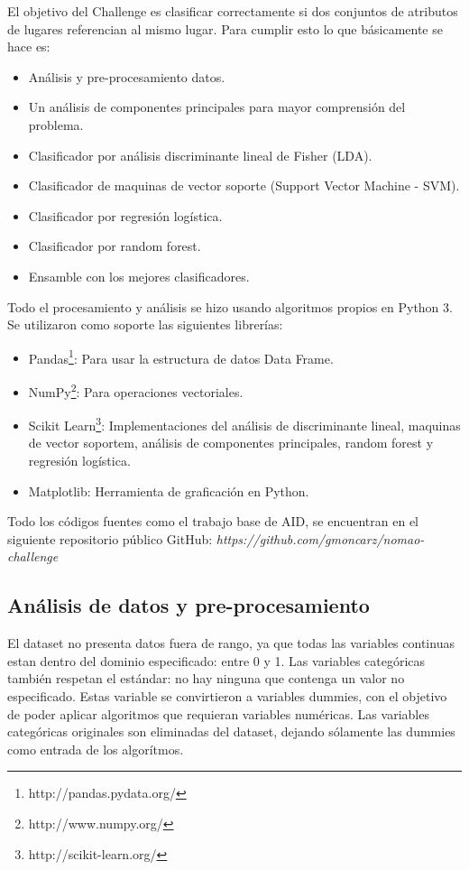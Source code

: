 \documentclass[journal]{IEEEtran}
\begin{document}
El objetivo del Challenge es clasificar correctamente si dos conjuntos 
de atributos de lugares referencian al mismo lugar. Para cumplir esto lo que básicamente se hace es:
\begin{itemize}
\item Análisis y pre-procesamiento datos. 
\item Un análisis de componentes principales para mayor comprensión del problema. 
\item Clasificador por análisis discriminante lineal de Fisher (LDA).
\item Clasificador de maquinas de vector soporte (Support Vector Machine - SVM).
\item Clasificador por regresión logística.
\item Clasificador por random forest.
\item Ensamble con los mejores clasificadores.
\end{itemize}

Todo el procesamiento y análisis se hizo usando algoritmos propios en Python 3. Se
utilizaron como soporte las siguientes librerías:
\begin{itemize}
\item Pandas\footnote{http://pandas.pydata.org/}: Para usar la estructura de datos Data Frame.
\item NumPy\footnote{http://www.numpy.org/}: Para operaciones vectoriales.
\item Scikit Learn\footnote{http://scikit-learn.org/}: Implementaciones del análisis 
	de discriminante lineal, maquinas de vector soportem, análisis
	de componentes principales, random forest y regresión logística.
\item Matplotlib: Herramienta de graficación en Python.
\end{itemize}

Todo los códigos fuentes como el trabajo base de AID,
se encuentran en el siguiente repositorio público GitHub: 
\textit{https://github.com/gmoncarz/nomao-challenge}

\subsection{Análisis de datos y pre-procesamiento}
El dataset no presenta datos fuera de rango, ya que todas las variables continuas estan
dentro del dominio especificado: entre 0 y 1. Las variables 
categóricas también respetan el estándar: no hay ninguna
que contenga un valor no especificado. Estas 
variable se convirtieron a variables dummies, con el objetivo 
de poder aplicar algoritmos que requieran variables numéricas. Las
variables categóricas originales son eliminadas del
dataset, dejando sólamente las dummies como entrada de los
algorítmos.
\end{document}
